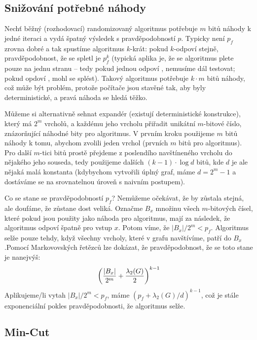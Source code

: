 \subsection{Snižování potřebné náhody}

Nechť běžný (rozhodovací) randomizovaný algoritmus potřebuje $m$ bitů náhody k jedné iteraci a
vydá špatný výsledek s pravděpodobností $p$. Typicky není $p_f$ zrovna dobré a tak
spustíme algoritmus $k$-krát: pokud $k$-odpoví stejně, pravděpodobnost, že se
spletl je $p_f^k$ (typická aplika je, že se algoritmus plete pouze na jednu
stranu -- tedy pokud jednou odpoví , nemusíme dál testovat; pokud opdoví
, mohl se splést). Takový algoritmus potřebuje $k\cdot m$ bitů náhody, což může být problém,
protože počítače jsou stavěné tak, aby byly deterministické, a pravá náhoda se
hledá těžko.

Můžeme si alternativně sehnat expandér (existují deterministické konstrukce),
který má $2^m$ vrcholů, a každému jeho vrcholu přiřadit unikátní $m$-bitové
číslo, znázorňující náhodné bity pro algoritmus. V prvním kroku použijeme $m$
bitů náhody k tomu, abychom zvolili jeden vrchol (prvních $m$ bitů pro
algoritmus). Pro další $m$-tici bitů prostě přejdeme z poslendího navštíneného
vrcholu do nějakého jeho souseda, tedy použijeme dalších $(k -1) \cdot \log d$ bitů, kde $d$
je ale nějaká malá konstanta (kdybychom vytvořili úplný graf, máme $d = 2^m-1$ a
dostáváme se na srovnatelnou úroveň s naivním postupem).

Co se stane se pravděpodobností $p_f$? Nemůžeme očekávat, že by zůstala stejná,
ale doufáme, že zůstane dost veliká. Označme $B_x$ množinu všech $m$-bitových
čísel, které pokud jsou použity jako náhoda pro algoritmus, mají za následek, že
algoritmus odpoví špatně pro vstup $x$. Potom víme, že $|B_x|/2^m < p_f$.
Algoritmus selže pouze tehdy, když všechny vrcholy, které v grafu navštívíme,
patří do $B_x$.Pomocí Markovovských řetězců lze dokázat, že pravděpodobnost, že
se toto stane je nanejvýš:
\begin{align}
	\left({|B_x| \over 2^m} + {\lambda_2(G) \over 2}\right)^{k-1}
\end{align}
Aplikujeme/li vytah $|B_x|/2^m < p_f$, máme $(p_f + \lambda_2(G)/d)^{k-1}$, což
je stále exponenciální pokles pravděpodobnosti, že algoritmus selže.

\subsection{Min-Cut}

